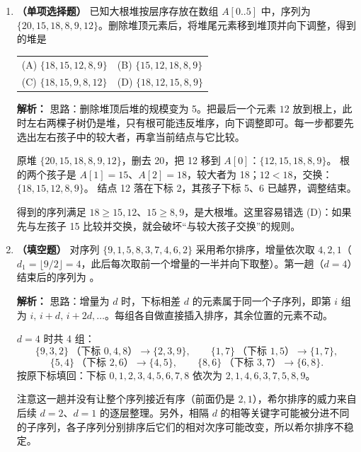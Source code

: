 \begin{enumerate}
\else \answerarea \fi

\item \textbf{（单项选择题）} 已知大根堆按层序存放在数组 $A[0..5]$ 中，序列为 $\{20,15,18,8,9,12\}$。删除堆顶元素后，将堆尾元素移到堆顶并向下调整，得到的堆是
\begin{center}
\begin{tabularx}{0.96\linewidth}{@{}XX@{}}
(A) $\{18,15,12,8,9\}$ & (B) $\{15,12,18,8,9\}$ \\[4pt]
(C) $\{18,15,9,8,12\}$ & (D) $\{18,12,15,8,9\}$
\end{tabularx}
\end{center}

\ifshowsolutions\par\noindent\textbf{解析：} 思路：删除堆顶后堆的规模变为 5。把最后一个元素 $12$ 放到根上，此时左右两棵子树仍是堆，只有根可能违反堆序，向下调整即可。每一步都要先选出左右孩子中的较大者，再拿当前结点与它比较。

原堆 $\{20,15,18,8,9,12\}$，删去 20，把 12 移到 $A[0]$：$\{12,15,18,8,9\}$。
根的两个孩子是 $A[1]=15$、$A[2]=18$，较大者为 18；$12<18$，交换：$\{18,15,12,8,9\}$。
结点 12 落在下标 2，其孩子下标 5、6 已越界，调整结束。

得到的序列满足 $18\geqslant 15,12$、$15\geqslant 8,9$，是大根堆。这里容易错选 (D)：如果先与左孩子 15 比较并交换，就会破坏“与较大孩子交换”的规则。

\else \answerarea \fi

\item \textbf{（填空题）} 对序列 $\{9,1,5,8,3,7,4,6,2\}$ 采用希尔排序，增量依次取 $4,2,1$（$d_1=\lfloor 9/2\rfloor=4$，此后每次取前一个增量的一半并向下取整）。第一趟（$d=4$）结束后的序列为 \underline{\qquad\qquad\qquad\qquad}。

\ifshowsolutions\par\noindent\textbf{解析：} 思路：增量为 $d$ 时，下标相差 $d$ 的元素属于同一个子序列，即第 $i$ 组为 $i,\,i+d,\,i+2d,\ldots$。每组各自做直接插入排序，其余位置的元素不动。

$d=4$ 时共 4 组：
\[
\{9,3,2\}\ \text{（下标 }0,4,8\text{）}\to\{2,3,9\},\qquad
\{1,7\}\ \text{（下标 }1,5\text{）}\to\{1,7\},
\]
\[
\{5,4\}\ \text{（下标 }2,6\text{）}\to\{4,5\},\qquad
\{8,6\}\ \text{（下标 }3,7\text{）}\to\{6,8\}.
\]
按原下标填回：下标 $0,1,2,3,4,5,6,7,8$ 依次为 $2,1,4,6,3,7,5,8,9$。

注意这一趟并没有让整个序列接近有序（前面仍是 $2,1$），希尔排序的威力来自后续 $d=2$、$d=1$ 的逐层整理。另外，相隔 $d$ 的相等关键字可能被分进不同的子序列，各子序列分别排序后它们的相对次序可能改变，所以希尔排序不稳定。


\end{enumerate}
